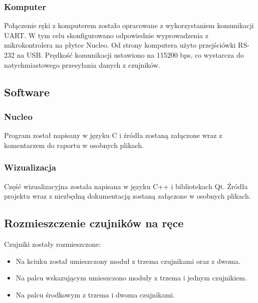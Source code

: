 \documentclass[a4paper,12pt]{article}
\begin{document}
			\subsubsection{Komputer}
				Połączenie ręki z komputerem zostało opracowane z wykorzystaniem komunikacji UART. W tym celu skonfigurowano odpowiednie wyprowadzenia z mikrokontrolera na płytce Nucleo. Od strony komputera użyto przejściówki RS-232 na USB. Prędkość komunikacji ustawiono na 115200 bps, co wystarcza do natychmiastowego przesyłania danych z czujników.	
		\subsection{Software}
			\subsubsection{Nucleo}
				Program został napisany w języku C i źródła zostaną załączone wraz z komentarzem do raportu w osobnych plikach.
			\subsubsection{Wizualizacja}
				Część wizualizacyjna została napisana w języku C++ i bibliotekach Qt. Źródła projektu wraz z niezbędną dokumentacją zostaną załączone w osobnych plikach.
		\subsection{Rozmieszczenie czujników na ręce}
		Czujniki zostały rozmieszczone:
		\begin{itemize}
			\item Na kciuku został umieszczony moduł z trzema czujnikami oraz z dwoma.
			\item Na palcu wskazującym umieszczono moduły z trzema i jednym czujnikiem.
			\item Na palcu środkowym z trzema i dwoma czujnikami.
		\end{itemize}
		
\end{document}
